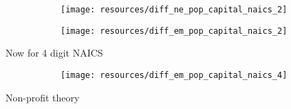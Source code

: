 \documentclass[12pt]{article}
\begin{document}
\begin{figure}[H]
	\centering
	\begin{subfigure}[b]{0.4\textwidth}
	    \texttt{[image: resources/diff\_ne\_pop\_capital\_naics\_2]}
	\end{subfigure}
	\begin{subfigure}[b]{0.4\textwidth}
	    \texttt{[image: resources/diff\_em\_pop\_capital\_naics\_2]}
	\end{subfigure}
\end{figure}

Now for 4 digit NAICS

\begin{figure}[H]
	\centering
	\begin{subfigure}[b]{0.4\textwidth}
	    \texttt{[image: resources/diff\_em\_pop\_capital\_naics\_4]}
	\end{subfigure}
\end{figure}

\pagebreak

Non-profit theory

\pagebreak

\begin{comment}

Triple diff of industry state measurements

\pagebreak

Next steps: can possibly look at PUMS individual (ACS) data on employment to see if industries with that were greatly affected by health care had more employment

\end{comment}
\end{document}
